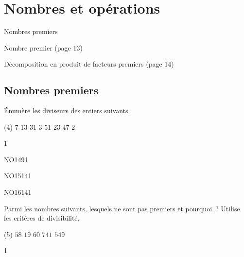 \documentclass[a4paper,11pt]{report}
\begin{document}
\newcommand{\chapterName}{Nombres et opérations}
\newcommand{\serieName}{Nombres premiers}

\chapter*{\chapterName}
\thispagestyle{empty}

\begin{amL}{\serieName}{
\item Nombre premier (page 13)
\item Décomposition en produit de facteurs premiers (page 14)
}\end{amL}

\section*{\serieName}
\setcounter{page}{1}


\begin{exo}{
    Énumère les diviseurs des entiers suivants. 
    \begin{tasks}(4)
    \task $7$
    \task $13$
    \task $31$
    \task $3$
    \task $51$
    \task $23$
    \task $47$
    \task $2$
\end{tasks}
}{1}\end{exo}

\begin{exof}{NO14}{9}{1}
\end{exof}

\begin{exol}{NO15}{14}{1}
\end{exol}

\begin{exol}{NO16}{14}{1}
\end{exol}



\begin{exo}{ %
    Parmi les nombres suivants, lesquels ne sont pas premiers et pourquoi~? Utilise les critères de divisibilité.
    \begin{tasks}(5)
    \task $58$
    \task $19$
    \task $60$
    \task $741$
    \task $549$
\end{tasks}
}{1}\end{exo}    
\end{document}
